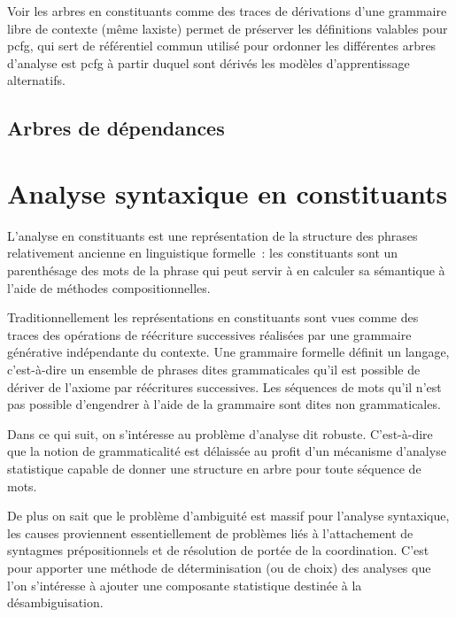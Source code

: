 \documentclass[11pt,openany]{book}
\newcommand{\ac}[1]{{\sc #1}} %
\begin{document}
Voir les arbres en constituants comme des traces de dérivations d'une grammaire libre de contexte (même laxiste) permet de préserver les définitions valables pour \ac{pcfg},
qui sert de référentiel commun utilisé pour ordonner les différentes arbres d'analyse est {\sc pcfg} à partir duquel sont dérivés les modèles d'apprentissage alternatifs.











\section{Arbres de dépendances}






\chapter{Analyse syntaxique en constituants}


L'analyse en constituants est une représentation de la structure des phrases relativement 
ancienne en linguistique formelle~: les constituants sont  un parenthésage des mots de la phrase 
qui peut servir à en calculer sa sémantique à l'aide de méthodes compositionnelles.

Traditionnellement les représentations en constituants sont vues comme des traces des opérations de réécriture successives 
réalisées par une grammaire générative indépendante du contexte. 
Une grammaire formelle définit un langage,  c'est-à-dire un ensemble de phrases dites grammaticales qu'il est possible de dériver de l'axiome 
par réécritures successives. Les séquences de mots qu'il n'est pas possible d'engendrer à l'aide de la grammaire sont dites non grammaticales.

Dans ce qui suit, on s'intéresse au problème d'analyse dit robuste. 
C'est-à-dire que la notion de grammaticalité est délaissée au profit d'un mécanisme d'analyse statistique
capable de donner une structure en arbre pour toute séquence de mots.

De plus on sait que le problème d'ambiguité est massif pour l'analyse syntaxique, les causes proviennent essentiellement de problèmes
liés à l'attachement de syntagmes prépositionnels et de résolution de portée de la coordination. C'est pour apporter une méthode de déterminisation
(ou de choix) des analyses que l'on s'intéresse à ajouter une composante statistique destinée à la désambiguisation.
\end{document}
